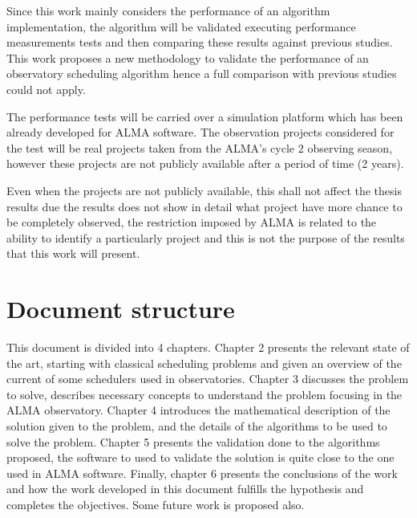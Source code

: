 Since this work mainly considers the performance of an algorithm implementation, the algorithm will be validated
executing performance measurements tests and then comparing these results against previous
studies. This work proposes a new methodology to validate the performance of an observatory
scheduling algorithm hence a full comparison with previous studies could not apply.

The performance tests will be carried over a simulation platform which has been already
developed for ALMA software. The observation projects considered for the test will be real
projects taken from the ALMA’s cycle 2 observing season, however these projects are not publicly
available after a period of time (2 years).

Even when the projects are not publicly available, this shall not affect the thesis results due the
results does not show in detail what project have more chance to be completely observed, the
restriction imposed by ALMA is related to the ability to identify a particularly project and this is
not the purpose of the results that this work will present.

\section{Document structure}
This document is divided into 4 chapters. Chapter 2 presents the relevant state of the art, starting with classical scheduling problems and given an overview of the current of some schedulers used in observatories. Chapter 3 discusses the problem to solve, describes necessary concepts to understand the problem focusing in the ALMA observatory. Chapter 4 introduces the mathematical description of the solution given to the problem, and the details of the algorithms to be used to solve the problem. Chapter 5 presents the validation done to the algorithms proposed, the software to used to validate the solution is quite close to the one used in ALMA software. Finally, chapter 6 presents the conclusions of the work and how the work developed in this document fulfills the hypothesis and completes the objectives. Some future work is proposed also.